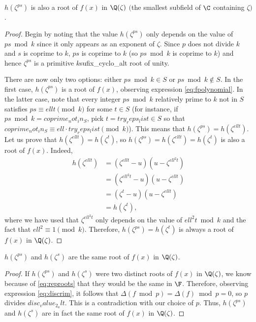 \begin{lemma}
$h(\zeta^{ps})$ is also a root of $f(x)$ in $\Q(\zeta)$ $($the smallest subfield of $\C$ containing $\zeta)$.
\end{lemma}
\begin{proof}
Begin by noting that the value $h(\zeta^{ps})$ only depends on the value of $ps \bmod{{k}}$ since it only appears as an exponent of $\zeta$. Since $p$ does not divide ${k}$ and $s$ is coprime to ${k}$, $ps$ is coprime to ${k}$ (so $ps \bmod{{k}}$ is coprime to ${k}$) and hence $\zeta^{ps}$ is a primitive ${k}${sufix_cyclo_alt} root of unity.

There are now only two options: either $ps \bmod{{k}}\in S$ or $ps \bmod{{k}}\notin S$. In the first case, $h(\zeta^{ps})$ is a root of $f(x)$, observing expression \eqref{eq:fpolynomial}. In the latter case, note that every integer $ps \bmod{{k}}$ relatively prime to ${k}$ not in $S$ satisfies $ps\equiv {ell}t\pmod{{k}}$ for some $t\in S$ (for instance, if $ps \bmod{{k}}={coprime_not_in_S}$, pick $t={try_reps_list}\in S$ so that ${coprime_not_in_S}\equiv {ell}\cdot{try_reps_list} \pmod{{k}}$). This means that $h(\zeta^{ps})=h(\zeta^{{ell}t})$. Let us prove that $h(\zeta^{{ell}t})=h(\zeta^{t})$, so $h(\zeta^{ps})=h(\zeta^{{ell}t})=h(\zeta^{t})$ is also a root of $f(x)$. Indeed,
\begin{align*}
h(\zeta^{{ell}t})&=(\zeta^{{ell}t}-{u})({u}-\zeta^{{ell}^2t})\\
&=(\zeta^{{ell}^2t}-{u})({u}-\zeta^{{ell}t})\\
&=(\zeta^{t}-{u})({u}-\zeta^{{ell}t})\\
&=h(\zeta^{t}),
\end{align*}
where we have used that $\zeta^{{ell}^2t}$ only depends on the value of ${ell}^2t \bmod{{k}}$ and the fact that ${ell}^2\equiv 1\pmod{{k}}$. Therefore, $h(\zeta^{ps})=h(\zeta^{t})$ is always a root of $f(x)$ in $\Q(\zeta)$.
\end{proof}

\begin{lemma}
$h(\zeta^{ps})$ and $h(\zeta^{s})$ are the same root of $f(x)$ in $\Q(\zeta)$.
\end{lemma}
\begin{proof}
If $h(\zeta^{ps})$ and $h(\zeta^{s})$ were two distinct roots of $f(x)$ in $\Q(\zeta)$, we know because of \eqref{eq:reproots} that they would be the same in $\F$. Therefore, observing expression \eqref{eq:discrim}, it follows that $\Delta(f \bmod{p})=\Delta(f) \bmod{p}=0$, so $p$ divides ${disc_value_2_alt}$. This is a contradiction with our choice of $p$. Thus, $h(\zeta^{ps})$ and $h(\zeta^{s})$ are in fact the same root of $f(x)$ in $\Q(\zeta)$.
\end{proof}

